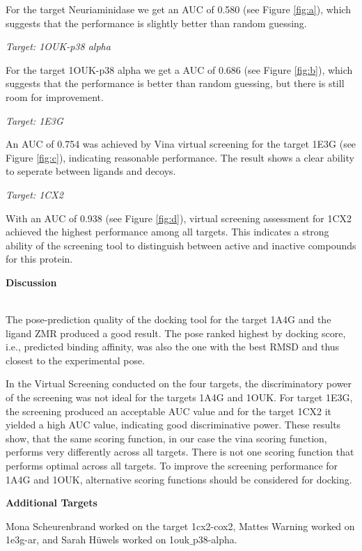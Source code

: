 \documentclass[a4paper,10pt]{article}
\begin{document}
For the target Neuriaminidase we get an AUC of 0.580 (see Figure \ref{fig:a}), which suggests that the performance is slightly better than random guessing. 



\textit{Target: 1OUK-p38 alpha}


For the target 1OUK-p38 alpha we get a AUC of 0.686 (see Figure \ref{fig:b}), which suggests that the performance is better than random guessing, but there is still room for improvement.

\textit{Target: 1E3G}

An AUC of 0.754 was achieved by Vina virtual screening for the target 1E3G (see Figure \ref{fig:c}), indicating reasonable performance. The result shows a clear ability to seperate between ligands and decoys.

\textit{Target: 1CX2}

With an AUC of 0.938 (see Figure \ref{fig:d}), virtual screening assessment for 1CX2 achieved the highest performance among all targets. This indicates a strong ability of the screening tool to distinguish between active and inactive compounds for this protein.




\begin{large}
	\vspace{0.5cm}
	\textbf{Discussion}
\end{large}	\\ [1mm]

The pose-prediction quality of the docking tool for the target 1A4G and the ligand ZMR produced a good result. The pose ranked highest by docking score, i.e., predicted binding affinity, was also  the one with the best RMSD and thus closest to the experimental pose. 

In the Virtual Screening conducted on the four targets, the discriminatory power of the screening was not ideal for the targets 1A4G and 1OUK. For target 1E3G, the screening produced an acceptable AUC value and for the target 1CX2 it yielded a high AUC value, indicating good discriminative power. These results show, that the same scoring function, in our case the vina scoring function, performs very differently across all targets. There is not one scoring function that performs optimal across all targets. To improve the screening performance for 1A4G and 1OUK, alternative scoring functions should be considered for docking.




\textbf{Additional Targets}

Mona Scheurenbrand worked on the target 1cx2-cox2, Mattes Warning worked on 1e3g-ar, and Sarah Hüwels worked on 1ouk$\_$p38-alpha.



\end{document}
